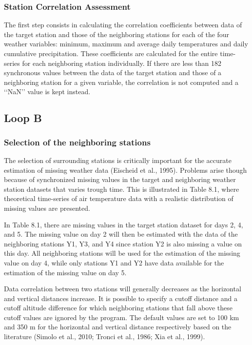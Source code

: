 \documentclass[ARTICLETHERMIC.tex]{subfiles}
\begin{document}
\subsubsection{Station Correlation Assessment}

The first step consists in calculating the correlation coefficients between data of the target station and those of the neighboring stations for each of the four weather variables: minimum, maximum and average daily temperatures and daily cumulative precipitation. These coefficients are calculated for the entire time-series for each neighboring station individually. If there are less than 182 synchronous values between the data of the target station and those of a neighboring station for a given variable, the correlation is not computed and a ‘‘NaN’’ value is kept instead.

\subsection{Loop B}

\subsubsection{Selection of the neighboring stations}

The selection of surrounding stations is critically important for the accurate estimation of missing weather data (Eischeid et al., 1995). Problems arise though because of synchronized missing values in the target and neighboring weather station datasets that varies trough time. This is illustrated in Table 8.1, where theoretical time-series of air temperature data with a realistic distribution of missing values are presented.

In Table 8.1, there are missing values in the target station dataset for days 2, 4, and 5. The missing value on day 2 will then be estimated with the data of the neighboring stations Y1, Y3, and Y4 since station Y2 is also missing a value on this day. All neighboring stations will be used for the estimation of the missing value on day 4, while only stations Y1 and Y2 have data available for the estimation of the missing value on day 5.

Data correlation between two stations will generally decreases as the horizontal and vertical distances increase. It is possible to specify a cutoff distance and a cutoff altitude difference for which neighboring stations that fall above these cutoff values are ignored by the program. The default values are set to 100 km and 350 m for the horizontal and vertical distance respectively based on the literature (Simolo et al., 2010; Tronci et al., 1986; Xia et al., 1999).
\end{document}
